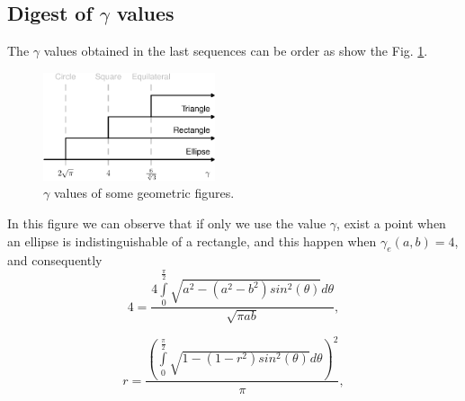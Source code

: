 \subsection{Digest of $\gamma$ values}
The $\gamma$ values obtained in the last sequences can be order as show the
Fig. \ref{fig:section1-diagrama1}.
\begin{figure}[h!]
\centering
\includegraphics[width=0.45\textwidth]{section1-diagrama1.eps}
\caption{$\gamma$ values of some geometric figures.}
\label{fig:section1-diagrama1}
\end{figure}
In this figure we can observe that if only we use the value $\gamma$,
 exist a point when an ellipse is indistinguishable of a rectangle,
and this happen when $\gamma_e(a,b)=4$, and consequently
\begin{equation}
4=\frac{4\int \limits_{0}^{\frac{\pi}{2}}{\sqrt{a^2-(a^2-b^2)sin^2(\theta)}d\theta}}{\sqrt{\pi ab}},
\end{equation}

\begin{equation}
r=\frac{\left(\int \limits_{0}^{\frac{\pi}{2}}{\sqrt{1-\left(1-r^2\right)sin^2(\theta)}d\theta}\right)^2}{\pi},
\end{equation}
